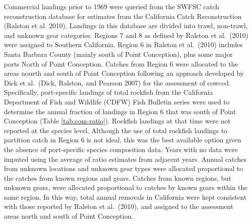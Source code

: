\documentclass[11pt,
  english,
  a4paper,
]{article}
\begin{document}
\leavevmode\tagmcend\tagstructend\par


Commercial landings prior to 1969 were queried from the SWFSC catch reconstruction database for estimates from the California Catch Reconstruction {(Ralston et al. 2010)\leavevmode\tagmcend\tagstructend}. Landings in this database are divided into trawl, non-trawl, and unknown gear categories. Regions 7 and 8 as defined by Ralston et al.~{(2010)\leavevmode\tagmcend\tagstructend} were assigned to Southern California. Region 6 in Ralston et al.~{(2010)\leavevmode\tagmcend\tagstructend} includes Santa Barbara County (mainly south of Point Conception), plus some major ports North of Point Conception. Catches from Region 6 were allocated to the areas nourth and south of Point Conception following an approach developed by Dick et al.~{(Dick, Ralston, and Pearson 2007)\leavevmode\tagmcend\tagstructend} for the assessment of cowcod. Specifically, port-specific landings of total rockfish from the California Department of Fish and Wildlife (CDFW) Fish Bulletin series were used to determine the annual fraction of landings in Region 6 that was south of Point Conception (Table \ref{tab:com-ratio}). Rockfish landings at that time were not reported at the species level. Although the use of total rockfish landings to partition catch in Region 6 is not ideal, this was the best available option given the absence of port-specific species composition data. Years with no data were imputed using the average of ratio estimates from adjacent years. Annual catches from unknown locations and unknown gear types were allocated proportional to the catches from known regions and gears. Catches from known regions, but unknown gears, were allocated proportional to catches by known gears within the same region. In this way, total annual removals in California were kept consistent with those reported by Ralston et al.~{(2010)\leavevmode\tagmcend\tagstructend}, and assigned to the assessment areas north and south of Point Conception.

\leavevmode\tagmcend\tagstructend\par

\end{document}
